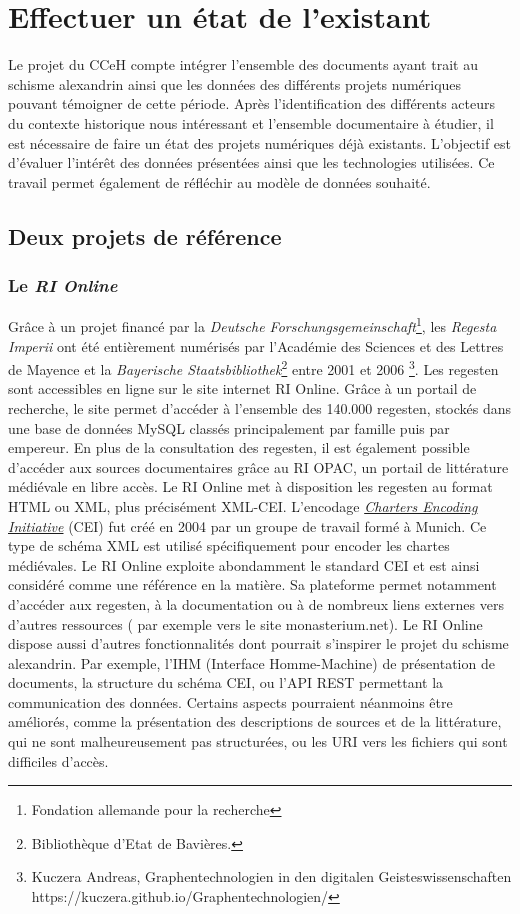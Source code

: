 \chapter{Effectuer un état de l'existant}

Le projet du CCeH compte intégrer l’ensemble des documents ayant trait au schisme alexandrin ainsi que les données des différents projets numériques pouvant témoigner de cette période. Après l’identification des différents acteurs du contexte historique nous intéressant et l’ensemble documentaire à étudier, il est nécessaire de faire un état des projets numériques déjà existants. L’objectif est d’évaluer l’intérêt des données présentées ainsi que les technologies utilisées. Ce travail permet également de réfléchir au modèle de données souhaité. 


    \section{Deux projets de référence}

    \subsection{Le \textit{RI Online}}

Grâce à un projet financé par la \textit{Deutsche Forschungsgemeinschaft}\footnote{Fondation allemande pour la recherche}, les \textit{Regesta Imperii} ont été entièrement numérisés par l’Académie des Sciences et des Lettres de Mayence et la \textit{Bayerische Staatsbibliothek}\footnote{Bibliothèque d’Etat de Bavières.} entre 2001 et 2006 \footnote{Kuczera Andreas, Graphentechnologien in den digitalen Geisteswissenschaften https://kuczera.github.io/Graphentechnologien/ }. Les regesten sont accessibles en ligne sur le site internet RI Online.
Grâce à un portail de recherche, le site permet d’accéder à l’ensemble des 140.000 regesten, stockés dans une base de données MySQL classés principalement par famille puis par empereur. En plus de la consultation des regesten, il est également possible d’accéder aux sources documentaires grâce au RI OPAC, un portail de littérature médiévale en libre accès.
Le RI Online met à disposition les regesten au format HTML ou XML, plus précisément XML-CEI. L’encodage \href{https://www.cei.lmu.de/}{\textit{Charters Encoding Initiative}} (CEI) fut créé en 2004 par un groupe de travail formé à Munich. Ce type de schéma XML est utilisé spécifiquement pour encoder les chartes médiévales. Le RI Online exploite abondamment le standard CEI et est ainsi considéré comme une référence en la matière. Sa plateforme permet notamment d’accéder aux regesten, à la documentation ou à de nombreux liens externes vers d’autres ressources ( par exemple vers le site monasterium.net). Le RI Online dispose aussi d’autres fonctionnalités dont pourrait  s’inspirer le projet du schisme alexandrin. Par exemple, l’IHM (Interface Homme-Machine)  de présentation de documents,  la structure  du schéma CEI, ou  l’API REST permettant la communication des données. 
Certains aspects pourraient néanmoins être améliorés, comme la présentation des descriptions de sources et de la littérature, qui ne sont malheureusement pas structurées, ou les URI vers les fichiers qui sont difficiles d’accès. 


